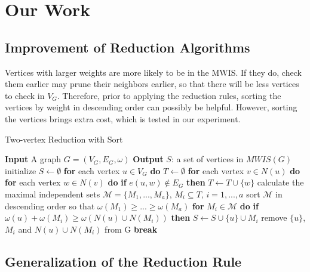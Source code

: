 \documentclass[sigconf, nonacm]{acmart}
\begin{document}
\section{Our Work}

\subsection{Improvement of Reduction Algorithms}

Vertices with larger weights are more likely to be in the MWIS. If they do, check them earlier may prune their neighbors earlier, so that there will be less vertices to check in $V_G$. Therefore, prior to applying the reduction rules, sorting the vertices by weight in descending order can possibly be helpful. However, sorting the vertices brings extra cost, which is tested in our experiment.

\begin{algorithm}[tbp]
\caption{Two-vertex Reduction with Sort}
\label{alg:2vertexsort}
\begin{algorithmic}
	\STATE   \textbf{Input} A graph $G=(V_G,E_G,\omega)$
	\STATE   \textbf{Output} $S$: a set of vertices in $MWIS(G)$
	\STATE   initialize $S\leftarrow \emptyset$
	\STATE   \textbf{for} each vertex $u\in V_G$ \textbf{do}
	\STATE   \quad $T \leftarrow \emptyset$
	\STATE   \quad \textbf{for} each vertex $v\in N(u)$ \textbf{do}
	\STATE   \quad \quad \textbf{for} each vertex $w\in N(v)$ \textbf{do}
	\STATE   \quad \quad \quad \textbf{if} $e(u,w) \notin E_G$ \textbf{then}
	\STATE   \quad \quad \quad \quad $T \leftarrow T \cup \{w\}$
	\STATE   \quad calculate the maximal independent sets $\mathcal{M}=\{M_1,...,M_a\}$, $M_i \subseteq T$, $i=1,...,a$
	\STATE   \quad sort $\mathcal{M}$ in descending order so that $\omega(M_1)\geq...\geq\omega(M_a)$
	\STATE   \quad \textbf{for} $M_i\in\mathcal{M}$ \textbf{do}
	\STATE   \quad \quad \textbf{if} $\omega(u)+\omega(M_i)\geq \omega(N(u)\cup N(M_i))$ \textbf{then}
	\STATE   \quad \quad \quad $S\leftarrow S\cup\{u\}\cup M_i$
	\STATE   \quad \quad \quad remove $\{u\}$, $M_i$ and $N(u)\cup N(M_i)$ from G
	\STATE   \quad \quad \quad \textbf{break}
\end{algorithmic}
\end{algorithm}

\subsection{Generalization of the Reduction Rule}
\end{document}
